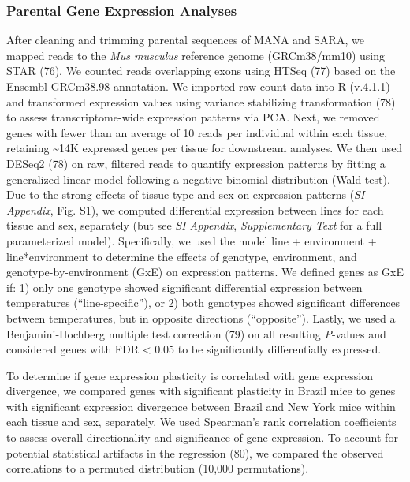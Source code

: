\documentclass[9pt,twocolumn,twoside,lineno]{pnas-new}
\begin{document}
\hypertarget{parental-gene-expression-analyses}{%
\subsubsection*{Parental Gene Expression
Analyses}\label{parental-gene-expression-analyses}}

After cleaning and trimming parental sequences of MANA and SARA, we
mapped reads to the \emph{Mus musculus} reference genome (GRCm38/mm10)
using STAR (76). We counted reads overlapping exons using HTSeq (77)
based on the Ensembl GRCm38.98 annotation. We imported raw count data
into R (v.4.1.1) and transformed expression values using variance
stabilizing transformation (78) to assess transcriptome-wide expression
patterns via PCA. Next, we removed genes with fewer than an average of
10 reads per individual within each tissue, retaining \textasciitilde14K
expressed genes per tissue for downstream analyses. We then used DESeq2
(78) on raw, filtered reads to quantify expression patterns by fitting a
generalized linear model following a negative binomial distribution
(Wald-test). Due to the strong effects of tissue-type and sex on
expression patterns (\emph{SI Appendix}, Fig. S1), we computed
differential expression between lines for each tissue and sex,
separately (but see \emph{SI Appendix}, \emph{Supplementary Text} for a
full parameterized model). Specifically, we used the model line +
environment + line*environment to determine the effects of genotype,
environment, and genotype-by-environment (GxE) on expression patterns.
We defined genes as GxE if: 1) only one genotype showed significant
differential expression between temperatures (``line-specific''), or 2)
both genotypes showed significant differences between temperatures, but
in opposite directions (``opposite''). Lastly, we used a
Benjamini-Hochberg multiple test correction (79) on all resulting
\textit{P}-values and considered genes with FDR \textless{} 0.05 to be
significantly differentially expressed.

To determine if gene expression plasticity is correlated with gene
expression divergence, we compared genes with significant plasticity in
Brazil mice to genes with significant expression divergence between
Brazil and New York mice within each tissue and sex, separately. We used
Spearman's rank correlation coefficients to assess overall
directionality and significance of gene expression. To account for
potential statistical artifacts in the regression (80), we compared the
observed correlations to a permuted distribution (10,000 permutations).
\end{document}
